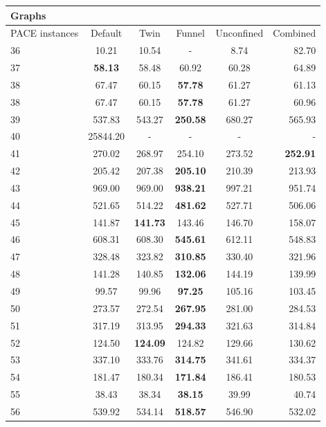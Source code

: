 \documentclass[a4paper,UKenglish,cleveref, autoref, thm-restate]{lipics-v2021}
\begin{document}
\begin{table}
	\begin{center}
		\begin{tabular}{|l| c| c| c| c| r|}
			
			\multicolumn{6}{|l|}{Graphs}\\	
			\hline
			PACE instances & Default & Twin & Funnel & Unconfined & Combined \\
			\hline
			36 & 10.21 & 10.54 & - & 8.74 & 82.70 \\
			37 & \textbf{58.13} & 58.48 & 60.92 & 60.28 & 64.89 \\
			38 & 67.47 & 60.15 & \textbf{57.78} & 61.27 & 61.13 \\
			38 & 67.47 & 60.15 & \textbf{57.78} & 61.27 & 60.96 \\
			39 & 537.83 & 543.27 & \textbf{250.58} & 680.27 & 565.93 \\
			40 & 25844.20 & - & - & - & - \\
			41 & 270.02 & 268.97 & 254.10 & 273.52 & \textbf{252.91} \\
			42 & 205.42 & 207.38 & \textbf{205.10} & 210.39 & 213.93 \\
			43 & 969.00 & 969.00 & \textbf{938.21} & 997.21 & 951.74 \\
			44 & 521.65 & 514.22 & \textbf{481.62} & 527.71 & 506.06 \\
			45 & 141.87 & \textbf{141.73} & 143.46 & 146.70 & 158.07 \\
			46 & 608.31 & 608.30 & \textbf{545.61} & 612.11 & 548.83 \\
			47 & 328.48 & 323.82 & \textbf{310.85} & 330.40 & 321.96 \\
			48 & 141.28 & 140.85 & \textbf{132.06} & 144.19 & 139.99 \\
			49 & 99.57 & 99.96 & \textbf{97.25} & 105.16 & 103.45 \\
			50 & 273.57 & 272.54 & \textbf{267.95} & 281.00 & 284.53 \\
			51 & 317.19 & 313.95 & \textbf{294.33} & 321.63 & 314.84 \\
			52 & 124.50 & \textbf{124.09} & 124.82 & 129.66 & 130.62 \\
			53 & 337.10 & 333.76 & \textbf{314.75} & 341.61 & 334.37 \\
			54 & 181.47 & 180.34 & \textbf{171.84} & 186.41 & 180.53 \\
			55 & 38.43 & 38.34 & \textbf{38.15} & 39.99 & 40.74 \\
			56 & 539.92 & 534.14 & \textbf{518.57} & 546.90 & 532.02 \\

\end{tabular}
\end{center}
\end{table}
\end{document}

